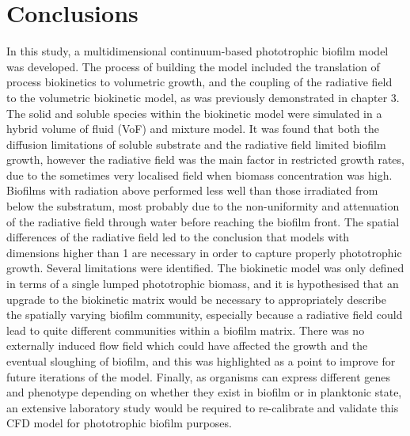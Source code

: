 \section{Conclusions}
In this study, a multidimensional continuum-based phototrophic biofilm model was developed. The process of building the model included the translation of process biokinetics to volumetric growth, and the coupling of the radiative field to the volumetric biokinetic model, as was previously demonstrated in chapter 3. The solid and soluble species within the biokinetic model were simulated in a hybrid volume of fluid (VoF) and mixture model.
\skippingparagraph
\skippingparagraph
It was found that both the diffusion limitations of soluble substrate and the radiative field limited biofilm growth, however the radiative field was the main factor in restricted growth rates, due to the sometimes very localised field when biomass concentration was high. Biofilms with radiation above performed less well than those irradiated from below the substratum, most probably due to the non-uniformity and attenuation of the radiative field through water before reaching the biofilm front. 
The spatial differences of the radiative field led to the conclusion that models with dimensions higher than 1 are necessary in order to capture properly phototrophic growth.
\skippingparagraph
Several limitations were identified. The biokinetic model was only defined in terms of a single lumped phototrophic biomass, and it is hypothesised that an upgrade to the biokinetic matrix would be necessary to appropriately describe the spatially varying biofilm community, especially because a radiative field could lead to quite different communities within a biofilm matrix. There was no externally induced flow field which could have affected the growth and the eventual sloughing of biofilm, and this was highlighted as a point to improve for future iterations of the model. Finally, as organisms can express different genes and phenotype depending on whether they exist in biofilm or in planktonic state, an extensive laboratory study would be required to re-calibrate and validate this CFD model for phototrophic biofilm purposes.